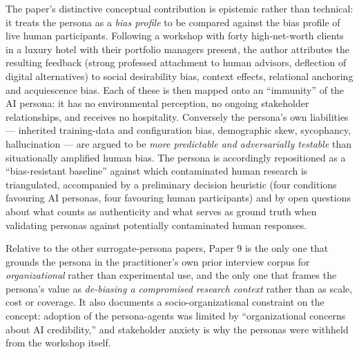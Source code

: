 The paper's distinctive conceptual contribution is epistemic rather than technical: it treats the persona as a \emph{bias profile} to be compared against the bias profile of live human participants. Following a workshop with forty high-net-worth clients in a luxury hotel with their portfolio managers present, the author attributes the resulting feedback (strong professed attachment to human advisors, deflection of digital alternatives) to social desirability bias, context effects, relational anchoring and acquiescence bias. Each of these is then mapped onto an ``immunity'' of the AI persona: it has no environmental perception, no ongoing stakeholder relationships, and receives no hospitality. Conversely the persona's own liabilities --- inherited training-data and configuration bias, demographic skew, sycophancy, hallucination --- are argued to be \emph{more predictable and adversarially testable} than situationally amplified human bias. The persona is accordingly repositioned as a ``bias-resistant baseline'' against which contaminated human research is triangulated, accompanied by a preliminary decision heuristic (four conditions favouring AI personas, four favouring human participants) and by open questions about what counts as authenticity and what serves as ground truth when validating personas against potentially contaminated human responses.

Relative to the other surrogate-persona papers, Paper 9 is the only one that grounds the persona in the practitioner's own prior interview corpus for \emph{organizational} rather than experimental use, and the only one that frames the persona's value as \emph{de-biasing a compromised research context} rather than as scale, cost or coverage. It also documents a socio-organizational constraint on the concept: adoption of the persona-agents was limited by ``organizational concerns about AI credibility,'' and stakeholder anxiety is why the personas were withheld from the workshop itself.

